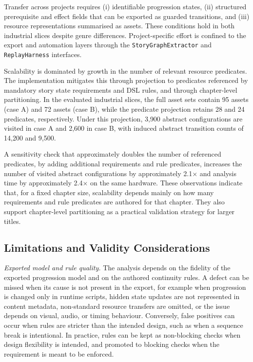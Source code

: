 \documentclass[conference]{IEEEtran}
\begin{document}
Transfer across projects requires (i) identifiable progression states,
(ii) structured prerequisite and effect fields that can be exported as
guarded transitions, and (iii) resource representations summarised as
assets. These conditions hold in both industrial slices despite genre
differences. Project-specific effort is confined to the export and
automation layers through the \texttt{StoryGraphExtractor} and
\texttt{ReplayHarness} interfaces.

Scalability is dominated by growth in the number of relevant resource
predicates. The implementation mitigates this through projection to
predicates referenced by mandatory story state requirements and DSL
rules, and through chapter-level partitioning. In the evaluated
industrial slices, the full asset sets contain 95 assets (case A) and
72 assets (case B), while the predicate projection retains 28 and 24
predicates, respectively. Under this projection, 3{,}900 abstract
configurations are visited in case A and 2{,}600 in case B, with induced
abstract transition counts of 14{,}200 and 9{,}500.

A sensitivity check that approximately doubles the number of referenced
predicates, by adding additional requirements and rule predicates,
increases the number of visited abstract configurations by approximately
2.1$\times$ and analysis time by approximately 2.4$\times$ on the same
hardware. These observations indicate that, for a fixed chapter size, scalability
depends mainly on how many requirements and rule predicates are authored
for that chapter. They also support chapter-level partitioning as a
practical validation strategy for larger titles.

\subsection{Limitations and Validity Considerations}
\label{sec:threats}

\noindent\emph{Exported model and rule quality.}
The analysis depends on the fidelity of the exported progression model
and on the authored continuity rules. A defect can be missed when its
cause is not present in the export, for example when progression is
changed only in runtime scripts, hidden state updates are not represented
in content metadata, non-standard resource transfers are omitted, or the
issue depends on visual, audio, or timing behaviour. Conversely, false
positives can occur when rules are stricter than the intended design, such
as when a sequence break is intentional. In practice, rules can be kept as
non-blocking checks when design flexibility is intended, and promoted to
blocking checks when the requirement is meant to be enforced.
\end{document}

